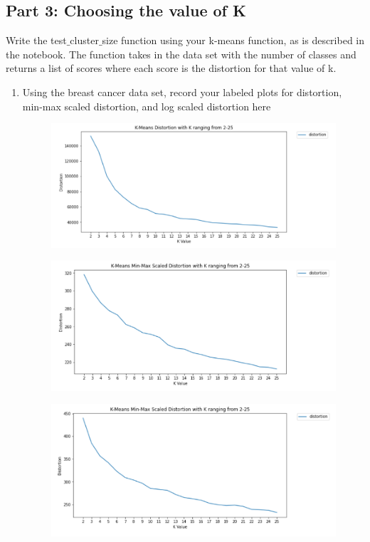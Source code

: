 \subsection{Part 3: Choosing the value of K}
Write the test$\_$cluster$\_$size function using your k-means function, as is described in the notebook. The function takes in the data set with the number of classes and returns a list of scores where each score is the distortion for that value of k.
\begin{enumerate}
    \item Using the breast cancer data set, record your labeled plots for distortion, min-max scaled distortion, and log scaled distortion here
    \newline
    \begin{figure}[H]
        	\centering
        	\includegraphics[width=.7\textwidth]{templates/distortion}
        	\label{fig:my_label}
        \end{figure}
\begin{figure}[H]
    	\centering
    	\includegraphics[width=.7\textwidth]{templates/scaled_distortion}
    	\label{fig:my_label}
    \end{figure}
\begin{figure}[H]
    	\centering
    	\includegraphics[width=.7\textwidth]{templates/minmax_distortion}

\end{figure}
\end{enumerate}
